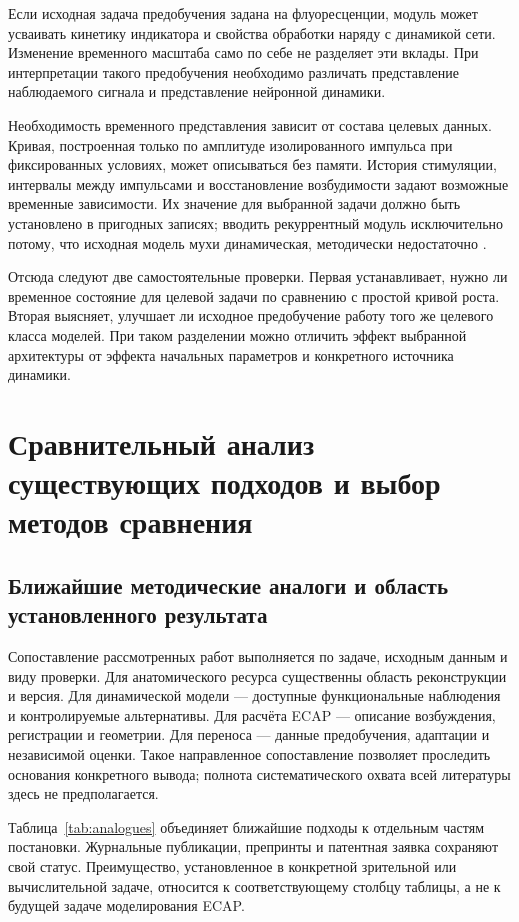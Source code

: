 Если исходная задача предобучения задана на флуоресценции, модуль может усваивать кинетику индикатора и свойства обработки наряду с динамикой сети. Изменение временного масштаба само по себе не разделяет эти вклады. При интерпретации такого предобучения необходимо различать представление наблюдаемого сигнала и представление нейронной динамики.

Необходимость временного представления зависит от состава целевых данных. Кривая, построенная только по амплитуде изолированного импульса при фиксированных условиях, может описываться без памяти. История стимуляции, интервалы между импульсами и восстановление возбудимости задают возможные временные зависимости. Их значение для выбранной задачи должно быть установлено в пригодных записях; вводить рекуррентный модуль исключительно потому, что исходная модель мухи динамическая, методически недостаточно \cite{posture,s789,s876,s877}.

Отсюда следуют две самостоятельные проверки. Первая устанавливает, нужно ли временное состояние для целевой задачи по сравнению с простой кривой роста. Вторая выясняет, улучшает ли исходное предобучение работу того же целевого класса моделей. При таком разделении можно отличить эффект выбранной архитектуры от эффекта начальных параметров и конкретного источника динамики.

\section{Сравнительный анализ существующих подходов и выбор методов сравнения}
\label{sec:comparisons}

\subsection{Ближайшие методические аналоги и область установленного результата}

Сопоставление рассмотренных работ выполняется по задаче, исходным данным и виду проверки. Для анатомического ресурса существенны область реконструкции и версия. Для динамической модели --- доступные функциональные наблюдения и контролируемые альтернативы. Для расчёта ECAP --- описание возбуждения, регистрации и геометрии. Для переноса --- данные предобучения, адаптации и независимой оценки. Такое направленное сопоставление позволяет проследить основания конкретного вывода; полнота систематического охвата всей литературы здесь не предполагается.

Таблица~\ref{tab:analogues} объединяет ближайшие подходы к отдельным частям постановки. Журнальные публикации, препринты и патентная заявка сохраняют свой статус. Преимущество, установленное в конкретной зрительной или вычислительной задаче, относится к соответствующему столбцу таблицы, а не к будущей задаче моделирования ECAP.

